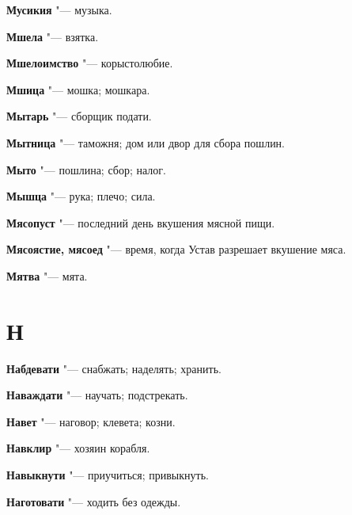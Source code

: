 \begin{mymulticols}{2}
\noindent\textbf{Мусикия} "--- музыка. 




\noindent\textbf{Мшела} "--- взятка. 




\noindent\textbf{Мшелоимство} "--- корыстолюбие. 




\noindent\textbf{Мшица} "--- мошка; мошкара. 




\noindent\textbf{Мытарь} "--- сборщик подати. 




\noindent\textbf{Мытница} "--- таможня; дом или двор для сбора пошлин. 




\noindent\textbf{Мыто} "--- пошлина; сбор; налог. 




\noindent\textbf{Мышца} "--- рука; плечо; сила. 




\noindent\textbf{Мясопуст} "--- последний день вкушения мясной пищи. 




\noindent\textbf{Мясоястие, мясоед} "--- время, когда Устав разрешает вкушение мяса. 




\noindent\textbf{Мятва} "--- мята. 




\section{Н}





\noindent\textbf{Набдевати} "--- снабжать; наделять; хранить. 




\noindent\textbf{Наваждати} "--- научать; подстрекать. 




\noindent\textbf{Навет} "--- наговор; клевета; козни. 




\noindent\textbf{Навклир} "--- хозяин корабля. 




\noindent\textbf{Навыкнути} "--- приучиться; привыкнуть. 




\noindent\textbf{Наготовати} "--- ходить без одежды. 





\end{mymulticols}
